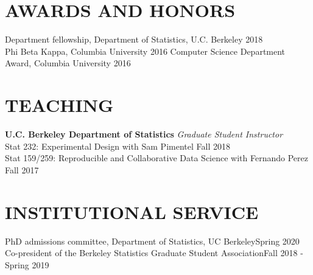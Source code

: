 \documentclass{res}
\begin{document}
\begin{resume}
\section{AWARDS AND HONORS}
\hspace{0.2em} Department fellowship, Department of Statistics, U.C. Berkeley \hfill 2018\\
\hspace{3em}{\footnotesize Two years of funding through RTG grant: Advancing Machine Learning - Causality and Interpretability}
\vskip -8pt
\hspace{0.2em} Phi Beta Kappa, Columbia University \hfill 2016
\vskip -8pt
\hspace{0.2em} Computer Science Department Award, Columbia University \hfill 2016\\
\hspace{3em}{\footnotesize Given to the top two graduating seniors each year}


\section{TEACHING}
\textbf{U.C. Berkeley Department of Statistics}
\textit{Graduate Student Instructor}\\
\hspace{0.2em} Stat 232: Experimental Design with Sam Pimentel \hfill Fall 2018\\
\hspace{0.2em} Stat 159/259: Reproducible and Collaborative Data Science with Fernando Perez \hfill Fall 2017


\section{INSTITUTIONAL SERVICE}

\medskip

\hspace{0.2em} 
PhD admissions committee, Department of Statistics, UC Berkeley\hfill Spring 2020
\vskip -8pt
\hspace{0.2em} 
Co-president of the Berkeley Statistics Graduate Student Association\hfill Fall 2018 - Spring 2019


\end{resume}
\end{document}
